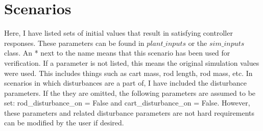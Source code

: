 \documentclass{article}
\begin{document}
\section{Scenarios}

Here, I have listed sets of initial values that result in satisfying controller responses. These parameters can be found in $plant\_inputs$ or the $sim\_inputs$ class. An * next to the name means that this scenario has been used for verification. If a parameter is not listed, this means the original simulation values were used. This includes things such as cart mass, rod length, rod mass, etc. In scenarios in which disturbances are a part of, I have included the disturbance parameters. If the they are omitted, the following parameters are assumed to be set: rod\_disturbance\_on = False and cart\_disturbance\_on = False. However, these parameters and related disturbance parameters are not hard requirements can be modified by the user if desired.
\end{document}
